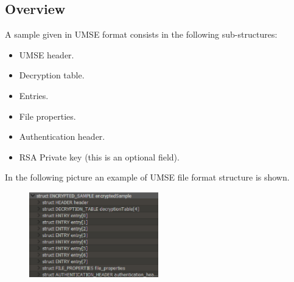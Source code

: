 \subsection{Overview}

A sample given in UMSE format consists in the following sub-structures:
\begin{itemize}
\item UMSE header.
\item Decryption table.
\item Entries.
\item File properties.
\item Authentication header.
\item RSA Private key (this is an optional field).
\end{itemize}

In the following picture an example of UMSE file format structure is shown.
\begin{figure}[h]
  \centering
  \includegraphics[width=0.5\textwidth]{./figures/UMSEFormat}
\end{figure}

